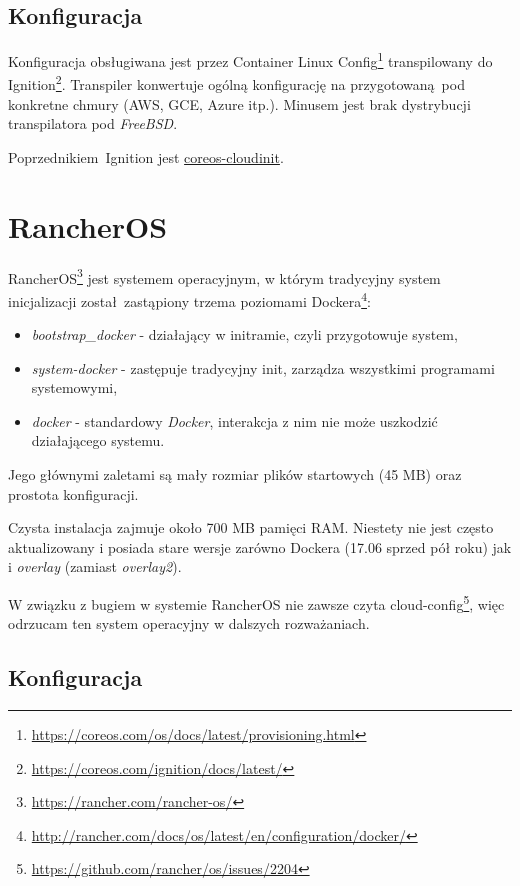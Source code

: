 \documentclass[a4paper,12pt,twoside,openany]{report}
\providecommand{\tightlist}{%
  \setlength{\itemsep}{0pt}\setlength{\parskip}{0pt}}
\DeclareRobustCommand{\href}[2]{#2\footnote{\url{#1}}}
\begin{document}
\hypertarget{konfiguracja}{%
\subsection{Konfiguracja}\label{konfiguracja}}

Konfiguracja obsługiwana jest przez
\href{https://coreos.com/os/docs/latest/provisioning.html}{Container
Linux Config} transpilowany do
\href{https://coreos.com/ignition/docs/latest/}{Ignition}. Transpiler
konwertuje ogólną konfigurację na przygotowaną~pod konkretne chmury
(AWS, GCE, Azure itp.). Minusem jest brak dystrybucji transpilatora pod
\emph{FreeBSD}.

Poprzednikiem~Ignition jest
\protect\hyperlink{coreos-cloudinit}{coreos-cloudinit}.

\hypertarget{rancheros}{%
\section{RancherOS}\label{rancheros}}

\href{https://rancher.com/rancher-os/}{RancherOS} jest systemem
operacyjnym, w którym tradycyjny system inicjalizacji został~zastąpiony
\href{http://rancher.com/docs/os/latest/en/configuration/docker/}{trzema
poziomami Dockera}:

\begin{itemize}
\tightlist
\item
  \emph{bootstrap\_docker} - działający w initramie, czyli przygotowuje
  system,
\item
  \emph{system-docker} - zastępuje tradycyjny init, zarządza wszystkimi
  programami systemowymi,
\item
  \emph{docker} - standardowy \emph{Docker}, interakcja z nim nie może
  uszkodzić działającego systemu.
\end{itemize}

Jego głównymi zaletami są mały rozmiar plików startowych (45 MB) oraz
prostota konfiguracji.

Czysta instalacja zajmuje około 700 MB pamięci RAM. Niestety nie jest
często aktualizowany i posiada stare wersje zarówno Dockera (17.06
sprzed pół roku) jak i \emph{overlay} (zamiast \emph{overlay2}).

W związku z bugiem w systemie RancherOS
\href{https://github.com/rancher/os/issues/2204}{nie zawsze czyta
cloud-config}, więc odrzucam ten system operacyjny w dalszych
rozważaniach.

\hypertarget{ros-config}{%
\subsection{Konfiguracja}\label{ros-config}}
\end{document}
